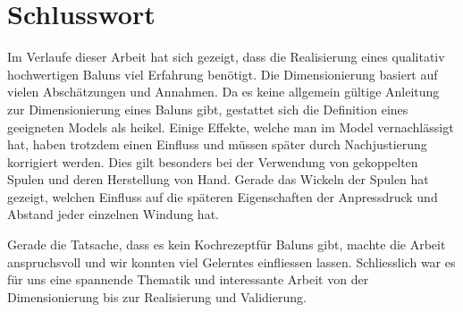 \section{Schlusswort}
Im Verlaufe dieser Arbeit hat sich gezeigt, dass die Realisierung eines qualitativ hochwertigen Baluns viel Erfahrung benötigt. Die Dimensionierung basiert auf vielen Abschätzungen und Annahmen. Da es keine allgemein gültige Anleitung zur Dimensionierung eines Baluns gibt, gestattet sich die Definition eines geeigneten Models als heikel. Einige Effekte, welche man im Model vernachlässigt hat, haben trotzdem einen Einfluss und müssen später durch Nachjustierung korrigiert werden. Dies gilt besonders bei der Verwendung von gekoppelten Spulen und deren Herstellung von Hand. Gerade das Wickeln der Spulen hat gezeigt, welchen Einfluss auf die späteren Eigenschaften der Anpressdruck und Abstand jeder einzelnen Windung hat.\newline

Gerade die Tatsache, dass es kein \glqq Kochrezept\grqq für Baluns gibt, machte die Arbeit anspruchsvoll und wir konnten viel Gelerntes einfliessen lassen.
Schliesslich war es für uns eine spannende Thematik und interessante Arbeit von der Dimensionierung bis zur Realisierung und Validierung.